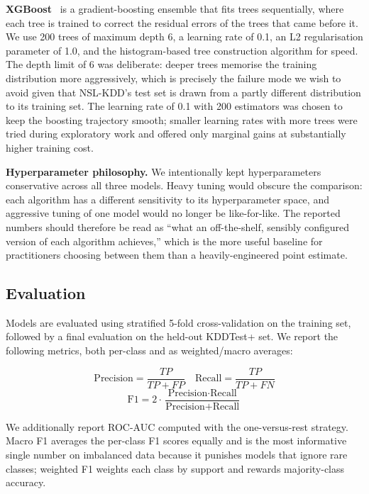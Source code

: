 \documentclass[conference, twocolumn]{IEEEtran}
\begin{document}
\textbf{XGBoost}~\cite{chen2016} is a gradient-boosting ensemble that fits trees sequentially, where each tree is trained to correct the residual errors of the trees that came before it. We use 200 trees of maximum depth 6, a learning rate of 0.1, an L2 regularisation parameter of 1.0, and the histogram-based tree construction algorithm for speed. The depth limit of 6 was deliberate: deeper trees memorise the training distribution more aggressively, which is precisely the failure mode we wish to avoid given that NSL-KDD's test set is drawn from a partly different distribution to its training set. The learning rate of 0.1 with 200 estimators was chosen to keep the boosting trajectory smooth; smaller learning rates with more trees were tried during exploratory work and offered only marginal gains at substantially higher training cost.

\textbf{Hyperparameter philosophy.} We intentionally kept hyperparameters conservative across all three models. Heavy tuning would obscure the comparison: each algorithm has a different sensitivity to its hyperparameter space, and aggressive tuning of one model would no longer be like-for-like. The reported numbers should therefore be read as ``what an off-the-shelf, sensibly configured version of each algorithm achieves,'' which is the more useful baseline for practitioners choosing between them than a heavily-engineered point estimate.

\subsection{Evaluation}

Models are evaluated using stratified 5-fold cross-validation on the training set, followed by a final evaluation on the held-out KDDTest+ set. We report the following metrics, both per-class and as weighted/macro averages:

\begin{equation}
    \text{Precision} = \frac{TP}{TP + FP} \quad
    \text{Recall} = \frac{TP}{TP + FN}
\end{equation}
\begin{equation}
    \text{F1} = 2 \cdot \frac{\text{Precision} \cdot \text{Recall}}{\text{Precision} + \text{Recall}}
\end{equation}

We additionally report ROC-AUC computed with the one-versus-rest strategy. Macro F1 averages the per-class F1 scores equally and is the most informative single number on imbalanced data because it punishes models that ignore rare classes; weighted F1 weights each class by support and rewards majority-class accuracy.
\end{document}
